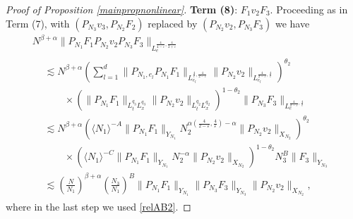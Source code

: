 \documentclass[10pt,leqno]{amsart}
\numberwithin{equation}{section}
\begin{document}
\begin{proof}[Proof of Proposition \ref{mainpropnonlinear}]
\textbf{Term (8)}:  $F_1 v_2 F_3$. 
Proceeding as in Term (7), with $(P_{N_3}v_3, P_{N_2}F_2)$ replaced by $(P_{N_2}v_2, P_{N_3} F_3)$  we have
\begin{multline*}
 N^{\beta +\alpha} \|P_{N_1}F_1  P_{N_2} v_2 P_{N_3} F_3\|_{L^{\frac{4}{4-\varepsilon} ,\frac{4}{2+\varepsilon}}_e} \\
\begin{aligned}
& \lesssim N^{\beta +\alpha} \left( \sum_{l=1}^d\|P_{N_1 ,e_l}P_{N_1} F_1\|_{L_{e_l}^{\frac{4}{\varepsilon} ,\frac{4}{2-\varepsilon} }}  \|P_{N_2} v_2\|_{L_{e_l}^{\frac{4}{2-\varepsilon}, \frac{4}{\varepsilon}}} \right)^{\theta_2} \\
&\qquad \times (\|P_{N_1}F_1\|_{L^{q_3}_t L_x^{ q_3 }} \|P_{N_2} v_2 \|_{L_t^{q_2 }L_x^{q_2} } )^{1-\theta_2}  \|P_{N_3} F_3\|_{L_e^{\frac{4}{2-\varepsilon} , \frac{4}{\varepsilon}}} \\
&\lesssim  N^{\beta +\alpha} (\langle N_1 \rangle^{-A} \|P_{N_1}F_1\|_{Y_{N_1}} N_2^{\alpha (\frac{4}{2-\varepsilon} ,\frac{4}{\varepsilon}) -\alpha} \|P_{N_2} v_2\|_{X_{N_2}} )^{\theta_2} \\
& \qquad \times (\langle N_1\rangle^{-C}\|P_{N_1}F_1\|_{Y_{N_1}}N_2^{-\alpha} \|P_{N_2}v_2 \|_{X_{N_2}} )^{1-\theta_2}  N_3^{B}\|F_3\|_{Y_{N_3}} \\
&\lesssim \left(\frac{N}{N_1}\right)^{\beta +\alpha}
\left(\frac{N_3 }{N_1}\right)^{ B}   \|P_{N_1}F_1\|_{Y_{N_1}}  \|P_{N_3 }F_3\|_{Y_{N_3}}   \|P_{N_2} v_2\|_{X_{N_2}},
\end{aligned}
\end{multline*}
where in the last step we used \eqref{relAB2}. 
\end{proof}
\end{document}

